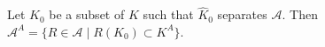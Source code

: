 Let $K_0$ be a subset of $K$ such that $\hat{K}_0$ separates $\mathcal{A}$. Then $\mathcal{A}^A = \{R \in \mathcal{A} \mid R(K_0) \subset K^A\}$.
